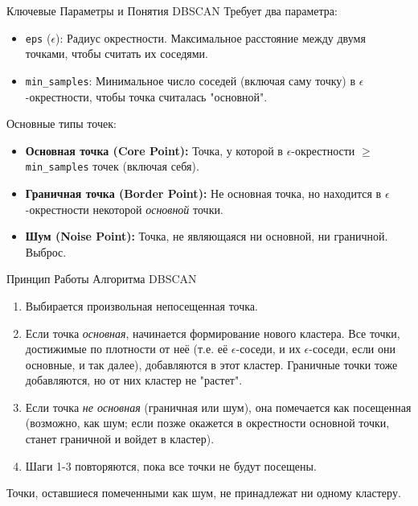 \begin{textbox}{Ключевые Параметры и Понятия DBSCAN}
    Требует два параметра:
    \begin{itemize}[nosep, leftmargin=*]
        \item \texttt{eps} ($ \epsilon $): Радиус окрестности. Максимальное расстояние между двумя точками, чтобы считать их соседями. %
        \item \texttt{min\_samples}: Минимальное число соседей (включая саму точку) в $ \epsilon $-окрестности, чтобы точка считалась "основной". %
    \end{itemize}
    \vspace{0.5ex}
    Основные типы точек:
    \begin{itemize}[nosep, leftmargin=*]
        \item \textbf{Основная точка (Core Point):} Точка, у которой в $ \epsilon $-окрестности $ \ge $ \texttt{min\_samples} точек (включая себя). %
        \item \textbf{Граничная точка (Border Point):} Не основная точка, но находится в $ \epsilon $-окрестности некоторой \textit{основной} точки. %
        \item \textbf{Шум (Noise Point):} Точка, не являющаяся ни основной, ни граничной. Выброс.
    \end{itemize}
\end{textbox}

\begin{myblock}{Принцип Работы Алгоритма DBSCAN}
    \begin{enumerate}[nosep, itemsep=0.5ex]
        \item Выбирается произвольная непосещенная точка.
        \item Если точка \textit{основная}, начинается формирование нового кластера. Все точки, достижимые по плотности от неё (т.е. её $\epsilon$-соседи, и их $\epsilon$-соседи, если они основные, и так далее), добавляются в этот кластер. Граничные точки тоже добавляются, но от них кластер не "растет".
        \item Если точка \textit{не основная} (граничная или шум), она помечается как посещенная (возможно, как шум; если позже окажется в окрестности основной точки, станет граничной и войдет в кластер).
        \item Шаги 1-3 повторяются, пока все точки не будут посещены.
    \end{enumerate}
    Точки, оставшиеся помеченными как шум, не принадлежат ни одному кластеру.
\end{myblock}

